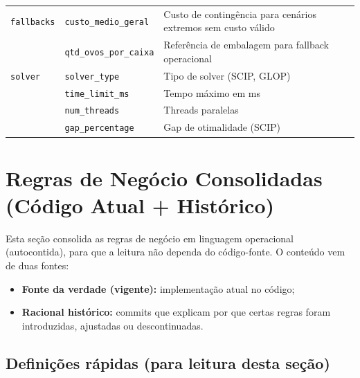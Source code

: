 \documentclass[11pt,a4paper]{article}
\begin{document}
\begin{longtable}{llp{7cm}}
\midrule
\texttt{fallbacks} & \texttt{custo\_medio\_geral} & Custo de contingência para cenários extremos sem custo válido \\
& \texttt{qtd\_ovos\_por\_caixa} & Referência de embalagem para fallback operacional \\
\midrule
\texttt{solver} & \texttt{solver\_type} & Tipo de solver (SCIP, GLOP) \\
& \texttt{time\_limit\_ms} & Tempo máximo em ms \\
& \texttt{num\_threads} & Threads paralelas \\
& \texttt{gap\_percentage} & Gap de otimalidade (SCIP) \\
\bottomrule
\end{longtable}

\section{Regras de Negócio Consolidadas (Código Atual + Histórico)}

Esta seção consolida as regras de negócio em linguagem operacional (autocontida),
para que a leitura não dependa do código-fonte. O conteúdo vem de duas fontes:
\begin{itemize}
    \item \textbf{Fonte da verdade (vigente):} implementação atual no código;
    \item \textbf{Racional histórico:} commits que explicam por que certas regras
    foram introduzidas, ajustadas ou descontinuadas.
\end{itemize}

\subsection{Definições rápidas (para leitura desta seção)}
\end{document}
